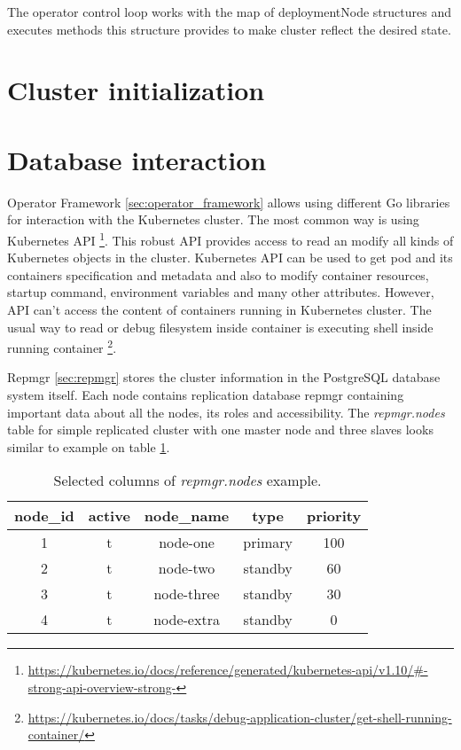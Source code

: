 \documentclass[
  digital, %
  twoside, %
  table,   %
  lof,     %
  lot,     %
]{fithesis3}
\begin{document}
 The operator control loop works with the map of deploymentNode structures and executes methods this structure provides to make cluster reflect the desired state.

\section{Cluster initialization}
\section{Database interaction}
Operator Framework \ref{sec:operator_framework} allows using different Go libraries for interaction with the Kubernetes cluster. The most common way is using Kubernetes API \footnote{\url{https://kubernetes.io/docs/reference/generated/kubernetes-api/v1.10/\#-strong-api-overview-strong-}}. This robust API provides access to read an modify all kinds of Kubernetes objects in the cluster. Kubernetes API can be used to get pod and its containers specification and metadata and also to modify container resources, startup command, environment variables and many other attributes. However, API can't access the content of containers running in Kubernetes cluster. The usual way to read or debug filesystem inside container is executing shell inside running container \footnote{\url{https://kubernetes.io/docs/tasks/debug-application-cluster/get-shell-running-container/}}.

Repmgr \ref{sec:repmgr} stores the cluster information in the PostgreSQL database system itself. Each node contains replication database repmgr containing important data about all the nodes, its roles and accessibility. The \textit{repmgr.nodes} table for simple replicated cluster with one master node and three slaves looks similar to example on table \ref{table:repmgr_nodes}.

\begin{table}[h!]
\centering
\begin{tabular}{|c c c c c|}
 \hline
 node\_id & active & node\_name & type & priority \\ [0.5ex] 
 \hline
 1 & t & node-one & primary & 100 \\ 

 2 & t & node-two & standby & 60 \\

 3 & t & node-three & standby & 30 \\

 4 & t & node-extra & standby & 0 \\ [1ex] 
 \hline
\end{tabular}
\caption{Selected columns of \textit{repmgr.nodes} example.}
\label{table:repmgr_nodes}
\end{table}
\end{document}
